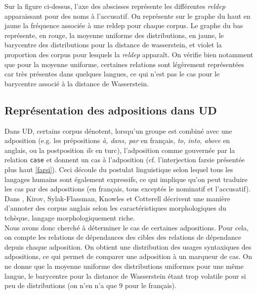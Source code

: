 \documentclass{cours}
\begin{document}
Sur la figure ci-dessus, l'axe des abscisses représente les différentes \textit{reldep} apparaissant pour des noms à l'accusatif.
On représente sur le graphe du haut en jaune la fréquence associée à une reldep pour chaque corpus.
Le graphe du bas représente, en rouge, la moyenne uniforme des distributions, en jaune, le barycentre des distributions pour la distance de wasserstein, et violet la proportion des corpus pour lesquels la \textit{reldep} apparaît.
On vérifie bien notamment que pour la moyenne uniforme, certaines relations sont légèrement représentées car très présentes dans quelques langues, ce qui n'est pas le cas pour le barycentre associé à la distance de Wasserstein.


\subsection{Représentation des adpositions dans UD}\label{subsec:adpos}
Dans UD, certains corpus dénotent, lorsqu'un groupe est combiné avec une adposition (e.g. les prépositions \textsl{à, dans, par} en français, \textsl{to, into, above} en anglais, ou la postposition \textsl{ile} en turc), l'adposition comme gouvernée par la relation \texttt{case} et donnent un cas à l'adposition (cf. l'interjection farsie présentée plus haut \ref{farsi}).
Ceci découle du postulat linguistique selon lequel tous les langages humains sont également expressifs, ce qui implique qu'on peut traduire les cas par des adpositions (en français, tous exceptés le nominatif et l'accusatif).
Dans \cite{morphenglish}, Kirov, Sylak-Flassman, Knowles et Cotterell décrivent une manière d'annoter des corpus anglais selon les caractéristiques morphologiques du tchèque, langage morphologiquement riche. \\
Nous avons donc cherché à déterminer le cas de certaines adpositions.
Pour cela, on compte les relations de dépendances des cibles des relations de dépendance depuis chaque adposition.
On obtient une distribution des usages syntaxiques des adpositions, ce qui permet de comparer une adposition à un marqueur de cas.
On ne donne que la moyenne uniforme des distributions uniformes pour une même langue, le barycentre pour la distance de Wasserstein étant trop volatile pour si peu de distributions (on n'en n'a que 9 pour le français).
\end{document}
